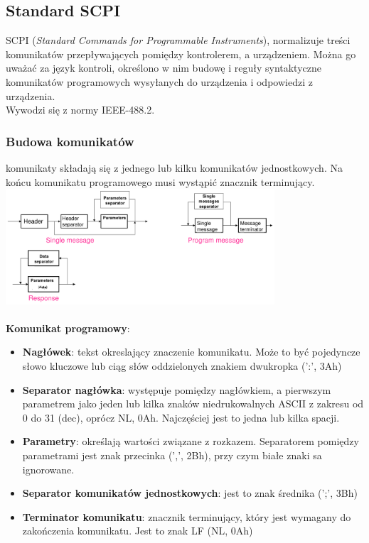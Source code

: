 \subsection{Standard SCPI}
SCPI (\emph{Standard Commands for Programmable Instruments}), normalizuje treści komunikatów przepływających pomiędzy kontrolerem, a urządzeniem. Można go uważać za język kontroli, określono w nim budowę i reguły syntaktyczne komunikatów programowych wysyłanych do urządzenia i odpowiedzi z urządzenia.\\
Wywodzi się z normy IEEE-488.2.

\subsubsection{Budowa komunikatów}
komunikaty składają się z jednego lub kilku komunikatów jednostkowych. Na końcu komunikatu programowego musi wystąpić znacznik terminujący.\\
\includegraphics[width=10cm]{./wyklady/IEEE488_SCPI_21_2.pdf}\\\\
\textbf{Komunikat programowy}:
\begin{itemize}
	\item \textbf{Nagłówek}: tekst okreslający znaczenie komunikatu. Może to być pojedyncze słowo kluczowe lub ciąg słów oddzielonych znakiem dwukropka (':', 3Ah)
	\item \textbf{Separator nagłówka}: występuje pomiędzy nagłówkiem, a pierwszym parametrem jako jeden lub kilka znaków niedrukowalnych ASCII z zakresu od 0 do 31 (dec), oprócz NL, 0Ah. Najczęściej jest to jedna lub kilka spacji.
	\item \textbf{Parametry}: określają wartości związane z rozkazem. Separatorem pomiędzy parametrami jest znak przecinka (',', 2Bh), przy czym białe znaki sa ignorowane.
	\item \textbf{Separator komunikatów jednostkowych}: jest to znak średnika (';', 3Bh)
	\item \textbf{Terminator komunikatu}: znacznik terminujący, który jest wymagany do zakończenia komunikatu. Jest to znak LF (NL, 0Ah)
\end{itemize}
